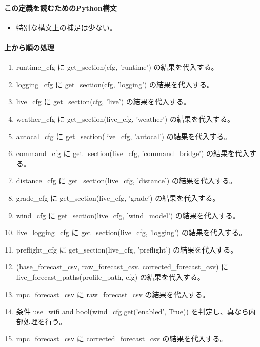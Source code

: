 \documentclass[a4paper,11pt]{article}
\begin{document}
            \paragraph{この定義を読むためのPython構文}
            \begin{itemize}[leftmargin=1.6em]
            \item 特別な構文上の補足は少ない。
            \end{itemize}
            \paragraph{上から順の処理}
            \begin{enumerate}[leftmargin=1.8em]
            \item runtime\_cfg に get\_section(cfg, 'runtime') の結果を代入する。
\item logging\_cfg に get\_section(cfg, 'logging') の結果を代入する。
\item live\_cfg に get\_section(cfg, 'live') の結果を代入する。
\item weather\_cfg に get\_section(live\_cfg, 'weather') の結果を代入する。
\item autocal\_cfg に get\_section(live\_cfg, 'autocal') の結果を代入する。
\item command\_cfg に get\_section(live\_cfg, 'command\_bridge') の結果を代入する。
\item distance\_cfg に get\_section(live\_cfg, 'distance') の結果を代入する。
\item grade\_cfg に get\_section(live\_cfg, 'grade') の結果を代入する。
\item wind\_cfg に get\_section(live\_cfg, 'wind\_model') の結果を代入する。
\item live\_logging\_cfg に get\_section(live\_cfg, 'logging') の結果を代入する。
\item preflight\_cfg に get\_section(live\_cfg, 'preflight') の結果を代入する。
\item (base\_forecast\_csv, raw\_forecast\_csv, corrected\_forecast\_csv) に live\_forecast\_paths(profile\_path, cfg) の結果を代入する。
\item mpc\_forecast\_csv に raw\_forecast\_csv の結果を代入する。
\item 条件 use\_wifi and bool(wind\_cfg.get('enabled', True)) を判定し、真なら内部処理を行う。
\item   mpc\_forecast\_csv に corrected\_forecast\_csv の結果を代入する。

\end{enumerate}
\end{document}
